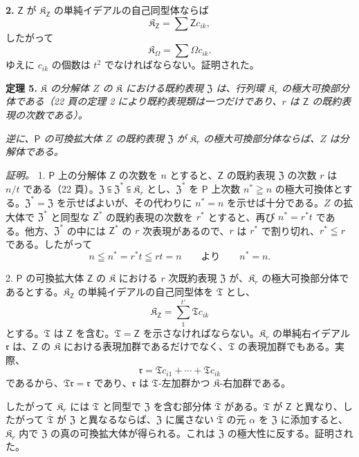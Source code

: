 \textbf{2.} $\mathsf{Z}$ が $\mathfrak K_{\mathsf{Z}}$ の単純イデアルの自己同型体ならば
\[
\mathfrak K_{\mathsf{Z}}=\sum\mathsf Zc_{ik},
\]
したがって
\[
\mathfrak K_\Omega=\sum\Omega c_{ik}.
\]
ゆえに $c_{ik}$ の個数は $t^2$ でなければならない。証明された。

\textbf{定理 5.} \emph{$\mathfrak K$ の分解体 $Z$ の $\mathfrak K$ における既約表現 $\mathfrak Z$ は、行列環 $\mathfrak K_r$ の極大可換部分体である（22 頁の定理 2 により既約表現類は一つだけであり、$r$ は $\mathsf{Z}$ の既約表現の次数である）。}

\emph{逆に、$\mathsf P$ の可換拡大体 $Z$ の既約表現 $\mathfrak Z$ が $\mathfrak K_r$ の極大可換部分体ならば、$Z$ は分解体である。}

\emph{証明。} 1. $\mathsf P$ 上の分解体 $\mathsf{Z}$ の次数を $n$ とすると、$\mathsf{Z}$ の既約表現 $\mathfrak Z$ の次数 $r$ は $n/t$ である（22 頁）。$\mathfrak Z\subseteqq\mathfrak Z^*\subseteqq\mathfrak K_r$ とし、$\mathfrak Z^*$ を $\mathsf P$ 上次数 $n^*\geqq n$ の極大可換体とする。$\mathfrak Z^*=\mathfrak Z$ を示せばよいが、その代わりに $n^*=n$ を示せば十分である。$Z$ の拡大体で $\mathfrak Z^*$ と同型な $\mathsf{Z}^*$ の既約表現の次数を $r^*$ とすると、再び $n^*=r^*t$ である。他方、$\mathfrak Z^*$ の中には $\mathsf{Z}^*$ の $r$ 次表現があるので、$r$ は $r^*$ で割り切れ、$r^*\leqq r$ である。したがって
\[
n\leqq n^*=r^*t\leqq rt=n \qquad\text{より}\qquad n^*=n.
\]

2. $\mathsf P$ の可換拡大体 $\mathsf{Z}$ の $\mathfrak K$ における $r$ 次既約表現 $\mathfrak Z$ が、$\mathfrak K_r$ の極大可換部分体であるとする。$\mathfrak K_{\mathsf{Z}}$ の単純イデアルの自己同型体を $\mathfrak T$ とし、
\[
\mathfrak K_{\mathsf{Z}}=\sum_{1}^{t'}\mathfrak T c_{ik}
\]
とする。$\mathfrak T$ は $\mathsf{Z}$ を含む。$\mathfrak T=\mathsf{Z}$ を示さなければならない。$\mathfrak K_r$ の単純右イデアル $\mathfrak r$ は、$\mathsf{Z}$ の $\mathfrak K$ における表現加群であるだけでなく、$\mathfrak T$ の表現加群でもある。実際、
\[
\mathfrak r=\mathfrak T c_{i1}+\cdots+\mathfrak T c_{ik}
\]
であるから、$\mathfrak T\mathfrak r=\mathfrak r$ であり、$\mathfrak r$ は $\mathfrak T$-左加群かつ $\mathfrak K$-右加群である。

したがって $\mathfrak K_r$ には $\mathfrak T$ と同型で $\mathfrak Z$ を含む部分体 $\overline{\mathfrak T}$ がある。$\mathfrak T$ が $\mathsf{Z}$ と異なり、したがって $\overline{\mathfrak T}$ が $\mathfrak Z$ と異なるならば、$\mathfrak Z$ に属さない $\overline{\mathfrak T}$ の元 $\alpha$ を $\mathfrak Z$ に添加すると、$\mathfrak K_r$ 内で $\mathfrak Z$ の真の可換拡大体が得られる。これは $\mathfrak Z$ の極大性に反する。証明された。

